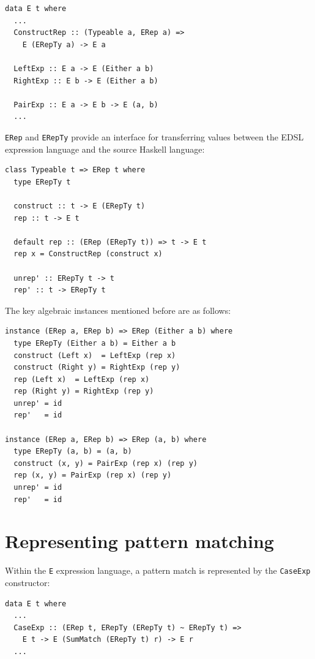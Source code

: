 \documentclass[runningheads, a4paper]{llncs}
\newcommand{\ttt}{\texttt}
\begin{document}
\begin{lstlisting}
data E t where
  ...
  ConstructRep :: (Typeable a, ERep a) =>
    E (ERepTy a) -> E a

  LeftExp :: E a -> E (Either a b)
  RightExp :: E b -> E (Either a b)

  PairExp :: E a -> E b -> E (a, b)
  ...
\end{lstlisting}

\ttt{ERep} and \ttt{ERepTy} provide an interface for transferring values between the EDSL
expression language and the source Haskell language:

\begin{lstlisting}
class Typeable t => ERep t where
  type ERepTy t

  construct :: t -> E (ERepTy t)
  rep :: t -> E t

  default rep :: (ERep (ERepTy t)) => t -> E t
  rep x = ConstructRep (construct x)

  unrep' :: ERepTy t -> t
  rep' :: t -> ERepTy t
\end{lstlisting}

The key algebraic instances mentioned before are as follows:

\begin{lstlisting}
instance (ERep a, ERep b) => ERep (Either a b) where
  type ERepTy (Either a b) = Either a b
  construct (Left x)  = LeftExp (rep x)
  construct (Right y) = RightExp (rep y)
  rep (Left x)  = LeftExp (rep x)
  rep (Right y) = RightExp (rep y)
  unrep' = id
  rep'   = id

instance (ERep a, ERep b) => ERep (a, b) where
  type ERepTy (a, b) = (a, b)
  construct (x, y) = PairExp (rep x) (rep y)
  rep (x, y) = PairExp (rep x) (rep y)
  unrep' = id
  rep'   = id
\end{lstlisting}



\section{Representing pattern matching}
\label{sec:PatRep}

Within the \ttt{E} expression language, a pattern match is represented by the
\ttt{CaseExp} constructor:

\begin{lstlisting}
data E t where
  ...
  CaseExp :: (ERep t, ERepTy (ERepTy t) ~ ERepTy t) =>
    E t -> E (SumMatch (ERepTy t) r) -> E r
  ...
\end{lstlisting}
\end{document}
